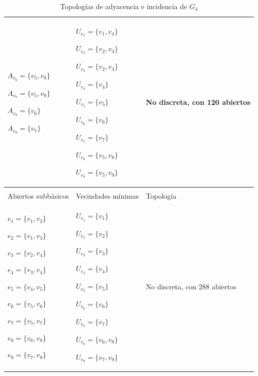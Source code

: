 \begin{table}[p]
\begin{tabular}{@{}>{\centering\arraybackslash}m{}>{\centering\arraybackslash}m{}>{\centering\arraybackslash}m{}@{}}
         ${A_{v_6}=\{v_5,v_8\}}$\par
         ${A_{v_7}=\{v_5,v_9\}}$\par
         ${A_{v_8}=\{v_6\}}$\par
         ${A_{v_9}=\{v_7\}}$
      &
         ${U_{v_1}=\{v_1,v_4\}}$\par
         ${U_{v_2}=\{v_2,v_3\}}$\par
         ${U_{v_3}=\{v_2,v_3\}}$\par
         ${U_{v_4}=\{v_4\}}$\par
         ${U_{v_5}=\{v_5\}}$\par
         ${U_{v_6}=\{v_6\}}$\par
         ${U_{v_7}=\{v_7\}}$\par
         ${U_{v_8}=\{v_5,v_8\}}$\par
         ${U_{v_9}=\{v_5,v_9\}}$
      &
                  No discreta, con 120 abiertos \\[6pt]
      \hline
      \multicolumn{3}{c}{\textbf{Topología de incidencia}} \\
      \hline
      Abiertos subbásicos & Vecindades mínimas & Topología \\
      \hline
         ${e_{1}=\{v_1,v_2\}}$\par
         ${e_{2}=\{v_1,v_3\}}$\par
         ${e_{3}=\{v_2,v_4\}}$\par
         ${e_{4}=\{v_3,v_4\}}$\par
         ${e_{5}=\{v_4,v_5\}}$\par
         ${e_{6}=\{v_5,v_6\}}$\par
         ${e_{7}=\{v_5,v_7\}}$\par
         ${e_{8}=\{v_6,v_8\}}$\par
         ${e_{9}=\{v_7,v_9\}}$
      &
         ${U_{v_1}=\{v_1\}}$\par
         ${U_{v_2}=\{v_2\}}$\par
         ${U_{v_3}=\{v_3\}}$\par
         ${U_{v_4}=\{v_4\}}$\par
         ${U_{v_5}=\{v_5\}}$\par
         ${U_{v_6}=\{v_6\}}$\par
         ${U_{v_7}=\{v_7\}}$\par
         ${U_{v_8}=\{v_6,v_8\}}$\par
         ${U_{v_9}=\{v_7,v_9\}}$
      &
                  No discreta, con 288 abiertos \\[6pt]      \hline
   \end{tabular}
   \caption{Topologías de adyacencia e incidencia de $G_4$}
   \label{tab:topologias_G_4}
\end{table}
